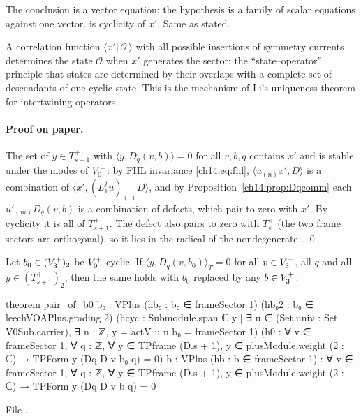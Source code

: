\begin{dictionary}
The conclusion is a vector equation; the hypothesis is a family of scalar equations against one
vector.   is cyclicity of $x'$.  Same as stated.
\end{dictionary}

\begin{physics}
A correlation function $\langle x'|\,\mathcal O\,\rangle$ with all possible insertions of symmetry
currents determines the state $\mathcal O$ when $x'$ generates the sector: the
``state--operator'' principle that states are determined by their overlaps with a complete set of
descendants of one cyclic state.  This is the mechanism of Li's uniqueness theorem for
intertwining operators.
\end{physics}

\paragraph{Proof on paper.}  The set of $y\in T_{s+1}^+$ with $\langle y,D_q(v,b)\rangle=0$ for all $v,b,q$
contains $x'$ and is stable under the modes of $V_0^{+}$: by FHL invariance \eqref{ch14:eq:fhl},
$\langle u_{(n)}x',D\rangle$ is a combination of $\langle x',(L_1^ju)_{(\cdot)}D\rangle$, and by
Proposition~\ref{ch14:prop:Dqcomm} each $u'_{(m)}D_q(v,b)$ is a combination of defects, which pair to zero
with $x'$.  By cyclicity it is all of $T_{s+1}^+$.  The defect also pairs to zero with $T_s^+$ (the two
frame sectors are orthogonal), so it lies in the radical of the nondegenerate . \qed

\begin{theorem}\label{ch14:thm:pairb0}
Let $b_0\in(V_3^{+})_2$ be $V_0^{+}$-cyclic.  If $\langle y,D_q(v,b_0)\rangle_T=0$ for all $v\in V_3^{+}$, all
$q$ and all $y\in(T_{s+1}^+)_2$, then the same holds with $b_0$ replaced by any $b\in V_3^{+}$.
\end{theorem}
\begin{leancode}
theorem pair_of_b0 {b₀ : VPlus} (hb₀ : b₀ ∈ frameSector 1) (hb₀2 : b₀ ∈ leechVOAPlus.grading 2)
    (hcyc : Submodule.span ℂ {y | ∃ u ∈ (Set.univ : Set V0Sub.carrier), ∃ n : ℤ, y = actV u n b₀}
      = frameSector 1)
    (h0 : ∀ v ∈ frameSector 1, ∀ q : ℤ, ∀ y ∈ TPframe (D.s + 1), y ∈ plusModule.weight (2 : ℂ) →
      TPForm y (Dq D v b₀ q) = 0)
    {b : VPlus} (hb : b ∈ frameSector 1) :
    ∀ v ∈ frameSector 1, ∀ q : ℤ, ∀ y ∈ TPframe (D.s + 1), y ∈ plusModule.weight (2 : ℂ) →
      TPForm y (Dq D v b q) = 0
\end{leancode}
File .

